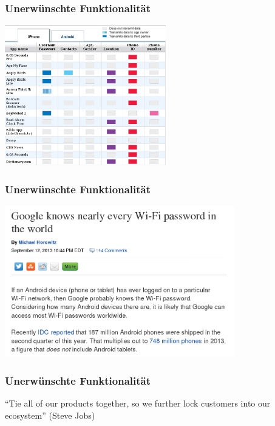 \documentclass[12pt, xcolor={svgnames,table}]{beamer}
\begin{document}
\begin{frame}
  \frametitle{Unerwünschte Funktionalität}
  \begin{center}
    \includegraphics[width=7cm]{img/backdoor-apps}
  \par\end{center}
\end{frame}

\begin{frame}
  \frametitle{Unerwünschte Funktionalität}
  \begin{center}
    \includegraphics[width=10cm]{img/backdoor-android}
  \par\end{center}
\end{frame}

\begin{frame}
  \frametitle{Unerwünschte Funktionalität}
  \begin{center}
    ``Tie all of our products together, so we further lock customers into our ecosystem'' (Steve Jobs)
  \end{center}
\end{frame}
\end{document}
